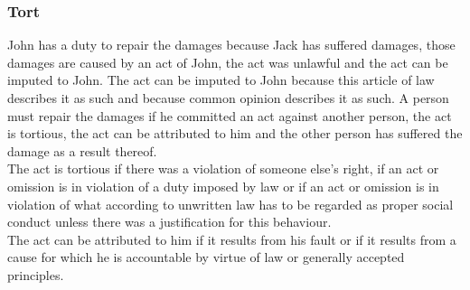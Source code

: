 \subsubsection{Tort}
\begin{exe}
\ex\label{e126} John has a duty to repair the damages because Jack has suffered damages, those damages are caused by an act of John, the act was unlawful and the act can be imputed to John. The act can be imputed to John because this article of law describes it as such and because common opinion describes it as such.
\ex\label{e127} A person must repair the damages if he committed an act against another person, the act is tortious, the act can be attributed to him and the other person has suffered the damage as a result thereof.\\ The act is tortious if there was a violation of someone else's right, if an act or omission is in violation of a duty imposed by law or if an act or omission is in violation of what according to unwritten law has to be regarded as proper social conduct unless there was a justification for this behaviour.\\ The act can be attributed to him if it results from his fault or if it results from a cause for which he is accountable by virtue of law or generally accepted principles.
\end{exe}

\clearpage